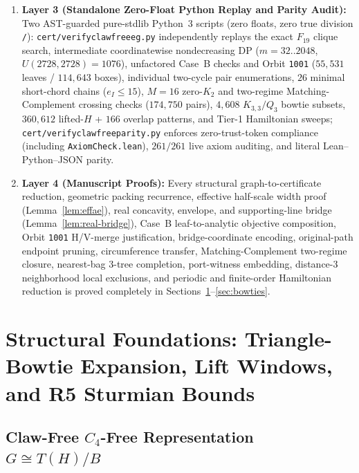 \documentclass[11pt,reqno]{amsart}
\theoremstyle{plain}
\theoremstyle{definition}
\theoremstyle{remark}
\DeclareRobustCommand{\_}{\ifmmode\text{\textunderscore}\else\textunderscore\allowbreak\fi}
\begin{document}
\begin{enumerate}[label=(\roman*),leftmargin=2.2em]
  \item \textbf{Layer 3 (Standalone Zero-Float Python Replay and Parity Audit):} Two AST-guarded pure-stdlib Python~3 scripts (zero floats, zero true division \texttt{/}): \texttt{cert/verify\_clawfree\_eg.py} independently replays the exact $F_{19}$ clique search, intermediate coordinatewise nondecreasing DP ($m = 32..2048$, $U(2728, 2728) = 1076$), unfactored Case~B checks and Orbit \texttt{1001} ($55{,}531$ leaves / $114{,}643$ boxes), individual two-cycle pair enumerations, $26$ minimal short-chord chains ($e_I \le 15$), $M = 16$ zero-$K_2$ and two-regime Matching-Complement crossing checks ($174{,}750$ pairs), $4{,}608$ $K_{3,3}/Q_3$ bowtie subsets, $360{,}612$ lifted-$H$ + $166$ overlap patterns, and Tier-1 Hamiltonian sweeps; \texttt{cert/verify\_clawfree\_parity.py} enforces zero-trust-token compliance (including \texttt{AxiomCheck.lean}), $261/261$ live axiom auditing, and literal Lean--Python--JSON parity.
  \item \textbf{Layer 4 (Manuscript Proofs):} Every structural graph-to-certificate reduction, geometric packing recurrence, effective half-scale width proof (Lemma~\ref{lem:effae}), real concavity, envelope, and supporting-line bridge (Lemma~\ref{lem:real-bridge}), Case~B leaf-to-analytic objective composition, Orbit \texttt{1001} H/V-merge justification, bridge-coordinate encoding, original-path endpoint pruning, circumference transfer, Matching-Complement two-regime closure, nearest-bag $3$-tree completion, port-witness embedding, distance-$3$ neighborhood local exclusions, and periodic and finite-order Hamiltonian reduction is proved completely in Sections~\ref{sec:foundations}--\ref{sec:bowties}.
\end{enumerate}

\section{Structural Foundations: Triangle-Bowtie Expansion, Lift Windows, and R5 Sturmian Bounds}\label{sec:foundations}

\subsection{Claw-Free \texorpdfstring{$C_4$}{C4}-Free Representation \texorpdfstring{$G \cong T(H)/B$}{G = T(H)/B}}\label{subsec:repr}
\end{document}
